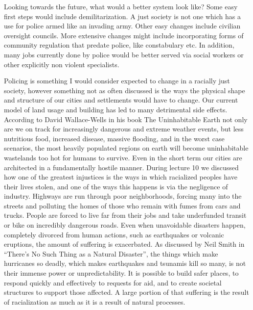 \documentclass[12pt]{article}
\begin{document}
Looking towards the future, what would a better system look like? Some easy first steps would include demilitarization.
A just society is not one which has a use for police armed like an invading army. Other easy changes include civilian 
oversight councils. More extensive changes might include incorporating forms of community regulation that predate police,
like constabulary etc. In addition, many jobs currently done by police would be better served via social workers or
other explicitly non violent specialists.

Policing is something I would consider expected to change in a racially just society, however something not as often
discussed is the ways the physical shape and structure of our cities and settlements would have to change.
Our current model of land usage and building has led to many detrimental side effects. According to
David Wallace-Wells in his book The Uninhabitable Earth\textcite{earth} not only are we on track for increasingly dangerous and extreme
weather events, but less nutritious food, increased disease, massive flooding, and in the worst case scenarios, the most
heavily populated regions on earth will become uninhabitable wastelands too hot for humans to survive.
Even in the short term our cities are architected in a fundamentally hostile manner. During lecture 10\textcite{lecture} we discussed
how one of the greatest injustices is the ways in which racialized peoples have their lives stolen, and one of the ways
this happens is via the negligence of industry. Highways are run through poor neighborhoods, forcing many into the streets
and polluting the homes of those who remain with fumes from cars and trucks. People are forced to live far from their
jobs and take underfunded transit or bike on incredibly dangerous roads. 
Even when unavoidable disasters happen, completely divorced from human actions, such as earthquakes or volcanic eruptions,
the amount of suffering is exacerbated. As discussed by Neil Smith in “There’s No Such Thing as a Natural Disaster”\textcite{smith}, the
things which make hurricanes so deadly, which makes earthquakes and tsunamis kill so many, is not their immense power or
unpredictability. It is possible to build safer places, to respond quickly and effectively to requests for aid, and to
create societal structures to support those affected. A large portion of that suffering is the result of racialization as
much as it is a result of natural processes.
\end{document}
